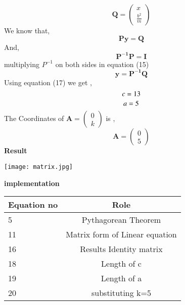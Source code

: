 \documentclass[10pt,a4paper]{report}
\let\vec\mathbf
\begin{document}
\begin{multicols}{2}
\begin{equation}
 \vec{Q} = \begin{pmatrix}
x\\
\frac{b^2}{m}
\end{pmatrix} 
\end{equation}\vspace{2mm}
We know that,\\
\begin{equation}
\vec{P  y = Q}
\end{equation}
And,\\
\begin{equation}
\vec{P^{-1} P = I}
\end{equation}
multiplying $P^{-1}$ on both sides in equation (15)\\
\begin{equation}
 \vec{y = P^{-1} Q}
\end{equation}
Using equation (17) we get ,
\begin{equation}
c = 13 \vspace{2mm}
\end{equation}
\begin{equation}
 a = 5 \vspace{2mm}
\end{equation}
The Coordinates of $\vec{A}=\begin{pmatrix}
0\\
k
\end{pmatrix}$  is ,\\
\begin{equation}
 \vec{A}=\begin{pmatrix}
0 \\
5
\end{pmatrix} 
\end{equation}
\textbf{Result} 
\begin{center}
 \texttt{[image: matrix.jpg]}  
 \end{center}\vspace{5mm}
 \vspace{2mm}  
\textbf{implementation}
\begin{center}
\setlength{\arrayrulewidth}{0.5mm}
\setlength{\tabcolsep}{5pt}
\renewcommand{\arraystretch}{3}
    \begin{tabular}{|l|c|}
    \hline 
    \textbf{Equation no} & \textbf{Role} \\ \hline
    5 &  Pythagorean Theorem \\ 
    11 & Matrix form of Linear equation  \\
    16 & Results Identity matrix  \\
    18 & Length of c\\
    19 & Length of a \\
    20 & substituting k=5\\
    \hline
      \end{tabular}
  \end{center} \vspace{2mm}
  

\end{multicols}
\end{document}
